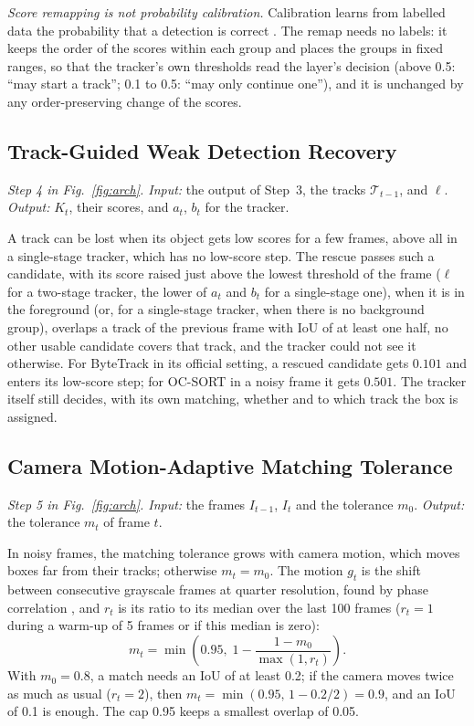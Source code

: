\emph{Score remapping is not probability calibration.} Calibration learns from labelled data the
probability that a detection is correct \cite{kuppers2020detcalib}. The remap needs no labels: it
keeps the order of the scores within each group and places the groups in fixed ranges, so that the
tracker's own thresholds read the layer's decision (above 0.5: ``may start a track''; 0.1 to 0.5:
``may only continue one''), and it is unchanged by any order-preserving change of the scores.

\subsection{Track-Guided Weak Detection Recovery}\label{sec:rescue}
\emph{Step 4 in Fig.~\ref{fig:arch}. Input:} the output of Step~3, the tracks $\mathcal{T}_{t-1}$,
and $\ell$. \emph{Output:} $K_t$, their scores, and $a_t$, $b_t$ for the tracker.

A track can be lost when its object gets low scores for a few frames, above all in a single-stage
tracker, which has no low-score step. The rescue passes such a candidate, with its score raised just
above the lowest threshold of the frame ($\ell$ for a two-stage tracker, the lower of $a_t$ and $b_t$
for a single-stage one), when it is in the foreground (or, for a single-stage tracker, when there is
no background group), overlaps a track of the previous frame with IoU of at least one half, no other
usable candidate covers that track, and the tracker could not see it otherwise. For ByteTrack in its
official setting, a rescued candidate gets $0.101$ and enters its low-score step; for OC-SORT in a
noisy frame it gets $0.501$. The tracker itself still decides, with its own matching, whether and to
which track the box is assigned.

\subsection{Camera Motion-Adaptive Matching Tolerance}\label{sec:motion}
\emph{Step 5 in Fig.~\ref{fig:arch}. Input:} the frames $I_{t-1}$, $I_t$ and the tolerance $m_0$.
\emph{Output:} the tolerance $m_t$ of frame $t$.

In noisy frames, the matching tolerance grows with camera motion, which moves boxes far from their
tracks; otherwise $m_t=m_0$. The motion $g_t$ is the shift between consecutive grayscale
frames at quarter resolution, found by phase correlation \cite{tong2019fourier}, and $r_t$ is its
ratio to its median over the last 100 frames ($r_t=1$ during a warm-up of 5 frames or if this median
is zero):
\begin{equation}
m_t=\min\!\left(0.95,\;1-\frac{1-m_0}{\max(1,r_t)}\right).
\label{eq:motion}
\end{equation}
With $m_0=0.8$, a match needs an IoU of at least 0.2; if the camera moves twice as much as usual
($r_t=2$), then $m_t=\min(0.95,\,1-0.2/2)=0.9$, and an IoU of 0.1 is enough. The cap 0.95 keeps a
smallest overlap of 0.05.

